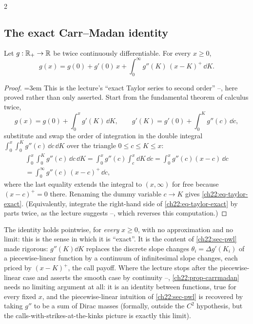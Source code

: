 \begin{paracol}{2}
\subsection{The exact Carr--Madan identity}\label{ch22:sec-taylor}
\begin{proposition}\label{ch22:prop-carrmadan}
Let $g:\mathbb{R}_+\to\mathbb{R}$ be twice continuously differentiable. For every $x\ge0$,
\begin{equation}\label{ch22:eq-taylor-exact}
  g(x) = g(0) + g'(0)\,x + \int_0^\infty g''(K)\,(x-K)^+\,\dd K.
\end{equation}
\end{proposition}
\begin{proof}
\emergencystretch=3em This is the lecture's ``exact Taylor series to second order'' --,
here proved rather than only asserted. Start from the fundamental theorem of calculus twice,
\[
  g(x) = g(0) + \int_0^x g'(K)\,\dd K, \qquad g'(K) = g'(0) + \int_0^K g''(c)\,\dd c,
\]
substitute and swap the order of integration in the double integral
$\int_0^x\!\int_0^K g''(c)\,\dd c\,\dd K$ over the triangle $0\le c\le K\le x$:
\[
  \begin{gathered}
  \int_0^x\int_0^K g''(c)\,\dd c\,\dd K = \int_0^x g''(c)\int_c^x \dd K\,\dd c = \int_0^x g''(c)(x-c)\,\dd c \\
  = \int_0^\infty g''(c)\,(x-c)^+\,\dd c,
  \end{gathered}
\]
where the last equality extends the integral to $(x,\infty)$ for free because $(x-c)^+=0$ there. Renaming
the dummy variable $c\to K$ gives \eqref{ch22:eq-taylor-exact}. (Equivalently, integrate the right-hand
side of \eqref{ch22:eq-taylor-exact} by parts twice, as the lecture suggests
--, which reverses this computation.)
\end{proof}

\begin{remark}
The identity holds pointwise, for \emph{every} $x\ge0$, with no approximation and no limit: this is the
sense in which it is ``exact''. It is the content of \cref{ch22:sec-pwl} made rigorous:
$g''(K)\dd K$ replaces the discrete slope changes $\theta_i=\Delta g'(K_i)$ of a piecewise-linear
function by a continuum of infinitesimal slope changes, each priced by $(x-K)^+$, the call payoff.
Where the lecture stops after the piecewise-linear case and asserts the smooth case by continuity
--, \cref{ch22:prop-carrmadan} needs no limiting argument at
all: it is an identity between functions, true for every fixed $x$, and the piecewise-linear intuition
of \cref{ch22:sec-pwl} is recovered by taking $g''$ to be a sum of Dirac masses (formally, outside the
$C^2$ hypothesis, but the calls-with-strikes-at-the-kinks picture is exactly this limit).
\end{remark}


\end{paracol}
